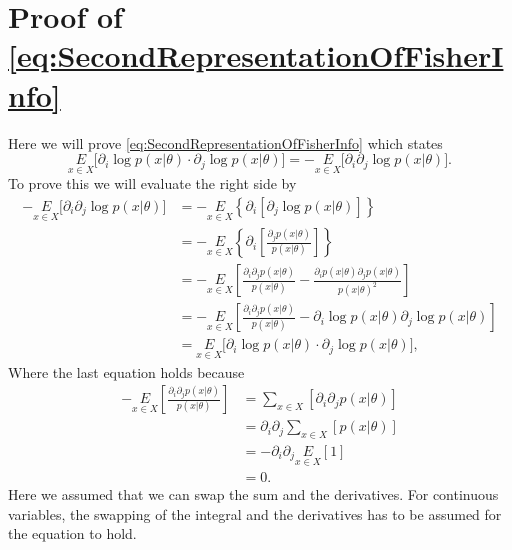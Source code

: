 \section{Proof of \cref{eq:SecondRepresentationOfFisherInfo}}
\label{sec:ProofForeq:SecondRepresentationOfFisherInfo}
Here we will prove \cref{eq:SecondRepresentationOfFisherInfo} which states \begin{equation}
	\underset{x\in X}{E} \Big[\partial_i\log p(x|\theta) \cdot \partial_j\log p(x|\theta) \Big] = -\underset{x\in X}{E} \Big[\partial_i\partial_j\log p(x|\theta)\Big].
\end{equation}
To prove this we will evaluate the right side by 
\newcommand{\p}{p(x|\theta)}
\begin{equation}
	\begin{split}
		-\underset{x\in X}{E} \Big[\partial_i\partial_j\log p(x|\theta)\Big] &= -\underset{x\in X}{E} \left\{\partial_i\left[\partial_j\log p(x|\theta)\right]\right\} \\
		&= -\underset{x\in X}{E} \left\{\partial_i\left[\frac{\partial_j p(x|\theta)}{p(x|\theta)}\right]\right\}\\
		&= -\underset{x\in X}{E} \left[\frac{\partial_i\partial_j p(x|\theta)}{p(x|\theta)} - \frac{\partial_i\p \partial_j \p}{\p^2}\right]\\
		&= -\underset{x\in X}{E} \left[\frac{\partial_i\partial_j p(x|\theta)}{p(x|\theta)} - \partial_i\log\p \partial_j \log\p\right]\\
		&= \underset{x\in X}{E} \Big[\partial_i\log p(x|\theta) \cdot \partial_j\log p(x|\theta) \Big],
	\end{split}
\end{equation}
Where the last equation holds because 
\begin{equation}
	\begin{split}
		-\underset{x\in X}{E} \left[\frac{\partial_i\partial_j p(x|\theta)}{p(x|\theta)}\right] &= \sum_{x\in X} \left[ \partial_i\partial_j p(x|\theta) \right]\\
		&= \partial_i \partial_j \sum_{x\in X} \left[ p(x|\theta) \right]\\
		&= -\partial_i \partial_j \underset{x\in X}{E} \left[1\right]\\
		&= 0.
	\end{split} 
\end{equation}
Here we assumed that we can swap the sum and the derivatives. For continuous variables, the swapping of the integral and the derivatives has to be assumed for the equation to hold.